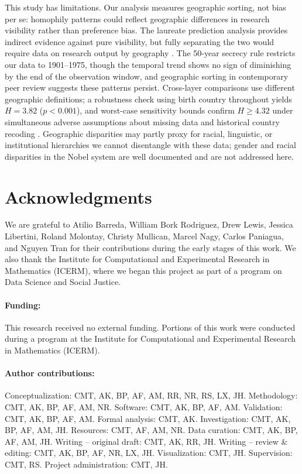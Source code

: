 \documentclass[12pt]{article}
\begin{document}
This study has limitations. Our analysis measures geographic sorting, not bias per se: homophily patterns could reflect geographic differences in research visibility rather than preference bias. The laureate prediction analysis provides indirect evidence against pure visibility, but fully separating the two would require data on research output by geography \cite{Sha1994}. The 50-year secrecy rule restricts our data to 1901--1975, though the temporal trend shows no sign of diminishing by the end of the observation window, and geographic sorting in contemporary peer review \cite{ZumTep2025} suggests these patterns persist. Cross-layer comparisons use different geographic definitions; a robustness check using birth country throughout yields $H = 3.82$ ($p < 0.001$), and worst-case sensitivity bounds confirm $H \geq 4.32$ under simultaneous adverse assumptions about missing data and historical country recoding \cite{methods}. Geographic disparities may partly proxy for racial, linguistic, or institutional hierarchies we cannot disentangle with these data; gender and racial disparities in the Nobel system are well documented \cite{LunJenJau2019, NeiVueVue2024} and are not addressed here.


\section*{Acknowledgments}

We are grateful to Atilio Barreda, William Bork Rodriguez, Drew Lewis, Jessica Libertini, Roland Molontay, Christy Mullican, Marcel Nagy, Carlos Paniagua, and Nguyen Tran for their contributions during the early stages of this work. We also thank the Institute for Computational and Experimental Research in Mathematics (ICERM), where we began this project as part of a program on Data Science and Social Justice.

\paragraph*{Funding:} This research received no external funding. Portions of this work were conducted during a program at the Institute for Computational and Experimental Research in Mathematics (ICERM).

\paragraph*{Author contributions:}
Conceptualization: CMT, AK, BP, AF, AM, RR, NR, RS, LX, JH.
Methodology: CMT, AK, BP, AF, AM, NR.
Software: CMT, AK, BP, AF, AM.
Validation: CMT, AK, BP, AF, AM.
Formal analysis: CMT, AK.
Investigation: CMT, AK, BP, AF, AM, JH.
Resources: CMT, AF, AM, NR.
Data curation: CMT, AK, BP, AF, AM, JH.
Writing -- original draft: CMT, AK, RR, JH.
Writing -- review \& editing: CMT, AK, BP, AF, NR, LX, JH.
Visualization: CMT, JH.
Supervision: CMT, RS.
Project administration: CMT, JH.
\end{document}
